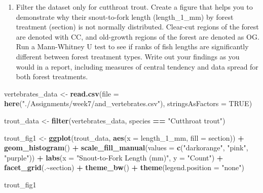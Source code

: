 \documentclass[
]{article}
\newenvironment{Shaded}{\begin{snugshade}}{\end{snugshade}}
\newcommand{\AttributeTok}[1]{\textcolor[rgb]{0.13,0.29,0.53}{#1}}
\newcommand{\ConstantTok}[1]{\textcolor[rgb]{0.56,0.35,0.01}{#1}}
\newcommand{\FunctionTok}[1]{\textcolor[rgb]{0.13,0.29,0.53}{\textbf{#1}}}
\newcommand{\NormalTok}[1]{#1}
\newcommand{\OtherTok}[1]{\textcolor[rgb]{0.56,0.35,0.01}{#1}}
\newcommand{\SpecialCharTok}[1]{\textcolor[rgb]{0.81,0.36,0.00}{\textbf{#1}}}
\newcommand{\StringTok}[1]{\textcolor[rgb]{0.31,0.60,0.02}{#1}}
\providecommand{\tightlist}{%
  \setlength{\itemsep}{0pt}\setlength{\parskip}{0pt}}
\begin{document}
\begin{enumerate}
\def\labelenumi{\alph{enumi}.}
\tightlist
\item
  Filter the dataset only for cutthroat trout. Create a figure that
  helps you to demonstrate why their snout-to-fork length
  (length\_1\_mm) by forest treatment (section) is not normally
  distributed. Clear-cut regions of the forest are denoted with CC, and
  old-growth regions of the forest are denoted as OG. Run a Mann-Whitney
  U test to see if ranks of fish lengths are significantly diﬀerent
  between forest treatment types. Write out your findings as you would
  in a report, including measures of central tendency and data spread
  for both forest treatments.
\end{enumerate}

\begin{Shaded}
\begin{Highlighting}[]
\NormalTok{vertebrates\_data }\OtherTok{\textless{}{-}} \FunctionTok{read.csv}\NormalTok{(}\AttributeTok{file =} \FunctionTok{here}\NormalTok{(}\StringTok{"./Assignments/week7/and\_vertebrates.csv"}\NormalTok{),}
                           \AttributeTok{stringsAsFactors =} \ConstantTok{TRUE}\NormalTok{)}

\NormalTok{trout\_data }\OtherTok{\textless{}{-}} \FunctionTok{filter}\NormalTok{(vertebrates\_data, }
\NormalTok{                              species }\SpecialCharTok{==} \StringTok{"Cutthroat trout"}\NormalTok{)}

\NormalTok{trout\_fig1 }\OtherTok{\textless{}{-}} \FunctionTok{ggplot}\NormalTok{(trout\_data, }\FunctionTok{aes}\NormalTok{(}\AttributeTok{x =}\NormalTok{ length\_1\_mm, }\AttributeTok{fill =}\NormalTok{ section)) }\SpecialCharTok{+}
  \FunctionTok{geom\_histogram}\NormalTok{() }\SpecialCharTok{+}
  \FunctionTok{scale\_fill\_manual}\NormalTok{(}\AttributeTok{values =} \FunctionTok{c}\NormalTok{(}\StringTok{"darkorange"}\NormalTok{, }\StringTok{"pink"}\NormalTok{, }\StringTok{"purple"}\NormalTok{)) }\SpecialCharTok{+}
  \FunctionTok{labs}\NormalTok{(}\AttributeTok{x =} \StringTok{"Snout{-}to{-}Fork Length (mm)"}\NormalTok{, }\AttributeTok{y =} \StringTok{"Count"}\NormalTok{) }\SpecialCharTok{+}
  \FunctionTok{facet\_grid}\NormalTok{(.}\SpecialCharTok{\textasciitilde{}}\NormalTok{section) }\SpecialCharTok{+}
  \FunctionTok{theme\_bw}\NormalTok{() }\SpecialCharTok{+}
  \FunctionTok{theme}\NormalTok{(}\AttributeTok{legend.position =} \StringTok{"none"}\NormalTok{)}

\NormalTok{trout\_fig1}
\end{Highlighting}
\end{Shaded}
\end{document}
